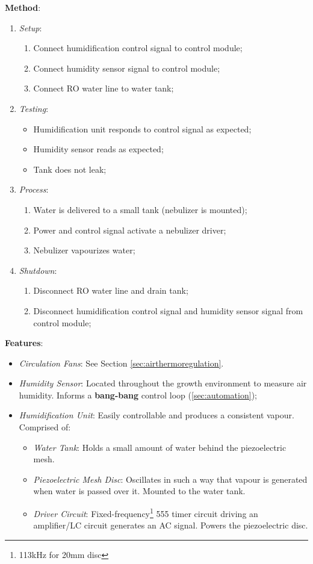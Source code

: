 \documentclass{report}
\begin{document}
\textbf{Method}:
\begin{enumerate}
    \item \textit{Setup}:
    \begin{enumerate}
        \item Connect humidification control signal to control module;
        \item Connect humidity sensor signal to control module;
        \item Connect RO water line to water tank;
    \end{enumerate}
    \item \textit{Testing}:
    \begin{itemize}
        \item Humidification unit responds to control signal as expected;
        \item Humidity sensor reads as expected;
        \item Tank does not leak;
    \end{itemize}
    \item \textit{Process}:
    \begin{enumerate}
        \item Water is delivered to a small tank (nebulizer is mounted);
        \item Power and control signal activate a nebulizer driver;
        \item Nebulizer vapourizes water;
    \end{enumerate}
    \item \textit{Shutdown}:
    \begin{enumerate}
        \item Disconnect RO water line and drain tank;
        \item Disconnect humidification control signal and humidity sensor signal from control module;
    \end{enumerate}
\end{enumerate}

\textbf{Features}:
\begin{itemize}
    \item \textit{Circulation Fans}: See Section \ref{sec:airthermoregulation}.
    \item \textit{Humidity Sensor}: Located throughout the growth environment to measure air humidity. Informs a \textbf{bang-bang} control loop (\ref{sec:automation});
    \item \textit{Humidification Unit}: Easily controllable and produces a consistent vapour. Comprised of:
    \begin{itemize}
        \item \textit{Water Tank}: Holds a small amount of water behind the piezoelectric mesh.
        \item \textit{Piezoelectric Mesh Disc}: Oscillates in such a way that vapour is generated when water is passed over it. Mounted to the water tank.
        \item \textit{Driver Circuit}: Fixed-frequency\footnote{113kHz for 20mm disc} 555 timer circuit driving an amplifier/LC circuit generates an AC signal. Powers the piezoelectric disc.
    \end{itemize}
\end{itemize}
\end{document}
